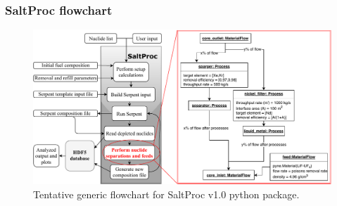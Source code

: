 \begin{frame}
\frametitle{SaltProc flowchart}
\vspace{-2mm}
\begin{figure}[ht!] %
	\centering
	\includegraphics[width=1.05\textwidth]{./images/saltproc_flowchart.pdf}
	\caption{Tentative generic flowchart for SaltProc v1.0 python package.}
\end{figure}

\end{frame}